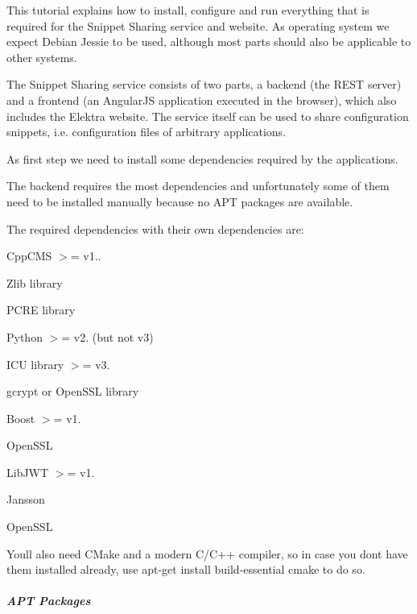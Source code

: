 This tutorial explains how to install, configure and run everything that is required for the Snippet Sharing service and website. As operating system we expect Debian Jessie to be used, although most parts should also be applicable to other systems.

The Snippet Sharing service consists of two parts, a backend (the R\+E\+ST server) and a frontend (an Angular\+JS application executed in the browser), which also includes the Elektra website. The service itself can be used to share configuration snippets, i.\+e. configuration files of arbitrary applications.

As first step we need to install some dependencies required by the applications.

The backend requires the most dependencies and unfortunately some of them need to be installed manually because no A\+PT packages are available.

The required dependencies with their own dependencies are\+:


\begin{DoxyItemize}
\item Cpp\+C\+MS $>$= v1..
\begin{DoxyItemize}
\item Zlib library
\item P\+C\+RE library
\item Python $>$= v2. (but not v3)
\item I\+CU library $>$= v3.
\item gcrypt or Open\+S\+SL library
\end{DoxyItemize}
\item Boost $>$= v1.
\item Open\+S\+SL
\item Lib\+J\+WT $>$= v1.
\begin{DoxyItemize}
\item Jansson
\item Open\+S\+SL
\end{DoxyItemize}
\end{DoxyItemize}

You\textquotesingle{}ll also need C\+Make and a modern C/\+C++ compiler, so in case you don\textquotesingle{}t have them installed already, use {\ttfamily apt-\/get install build-\/essential cmake} to do so.

\label{doc_tutorials_snippet-sharing-rest-service_md_autotoc_md2767}%
%
\subparagraph*{A\+PT Packages}

